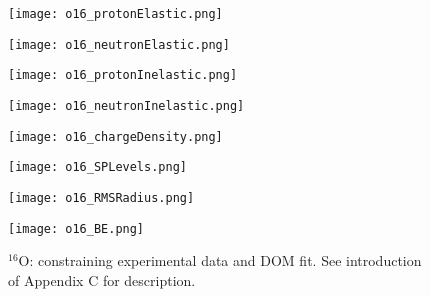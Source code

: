\documentclass[twocolumn,secnumarabic,amssymb, nobibnotes, aps, prl,
superscriptaddress, nobalancelastpage, floatfix]{revtex4}
\newcommand{\oSix}{\ensuremath{^{16}}O}
\begin{document}
{\begin{figure*}[!htb]
    \centering
    \begin{minipage}{0.4\linewidth}
        \centering
        \texttt{[image: o16\_protonElastic.png]}
        \label{DOM_o16_proton_elastic}
    \end{minipage}\hspace{6pt}
    \begin{minipage}{0.4\linewidth}
        \centering
        \texttt{[image: o16\_neutronElastic.png]}
        \label{DOM_o16_neutron_elastic}
    \end{minipage}
    \centering
    \begin{minipage}{0.4\linewidth}
        \centering
        \texttt{[image: o16\_protonInelastic.png]}
        \label{DOM_o16_proton_inelastic}
    \end{minipage}\hspace{6pt}
    \begin{minipage}{0.4\linewidth}
        \centering
        \texttt{[image: o16\_neutronInelastic.png]}
        \label{DOM_o16_neutron_inelastic}
    \end{minipage}
    \centering
    \begin{minipage}{0.4\linewidth}
        \centering
        \texttt{[image: o16\_chargeDensity.png]}
        \label{DOM_o16_chargeDensity}
    \end{minipage}\hspace{6pt}
    \begin{minipage}{0.4\linewidth}
        \centering
        \texttt{[image: o16\_SPLevels.png]}
        \label{DOM_o16_SPLevels}
    \end{minipage}
    \begin{minipage}{0.4\linewidth}
        \centering
        \texttt{[image: o16\_RMSRadius.png]}
        \label{DOM_o16_RMSRadius}
    \end{minipage}\hspace{6pt}
    \begin{minipage}{0.4\linewidth}
        \centering
        \texttt{[image: o16\_BE.png]}
        \label{DOM_o16_BE}
    \end{minipage}
    \caption{\oSix: constraining experimental data and DOM fit. See introduction of
    Appendix C for description.}
    \label{DOM_o16}
\end{figure*}

}
\end{document}
